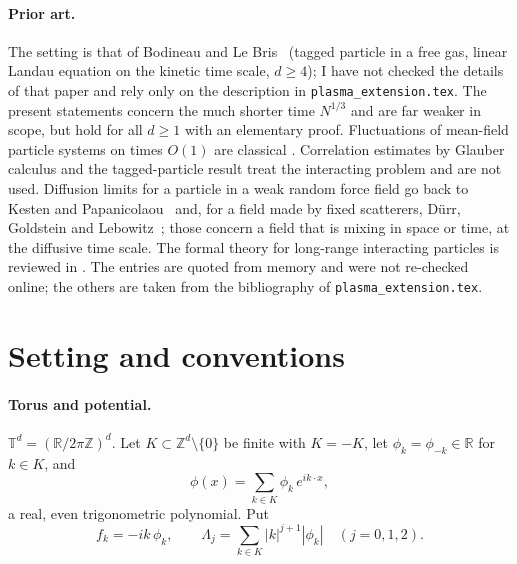 \documentclass[11pt]{article}
\newcommand{\T}{\mathbb{T}}
\newcommand{\R}{\mathbb{R}}
\newcommand{\Z}{\mathbb{Z}}
\theoremstyle{remark}
\begin{document}
\paragraph{Prior art.} The setting is that of Bodineau and Le
Bris~\cite{BodineauLeBris} (tagged particle in a free gas, linear Landau
equation on the kinetic time scale, $d\ge4$); I have not checked the details
of that paper and rely only on the description in
\texttt{plasma\_extension.tex}. The present statements concern the much
shorter time $N^{1/3}$ and are far weaker in scope, but hold for all $d\ge1$
with an elementary proof. Fluctuations of mean-field particle systems on
times $O(1)$ are classical \cite{BraunHepp,Lancellotti}. Correlation
estimates by Glauber calculus \cite{DuerinckxChaos} and the tagged-particle
result \cite{DuerinckxSR} treat the interacting problem and are not used.
Diffusion limits for a particle in a weak random force field go back to
Kesten and Papanicolaou~\cite{KP} and, for a field made by fixed scatterers,
D\"urr, Goldstein and Lebowitz~\cite{DGL}; those concern a field that is
mixing in space or time, at the diffusive time scale. The formal theory for
long-range interacting particles is reviewed in \cite{NVW}. The entries
\cite{KP,DGL,Bill,Kall,RY} are quoted from memory and were not re-checked
online; the others are taken from the bibliography of
\texttt{plasma\_extension.tex}.

\section{Setting and conventions}

\paragraph{Torus and potential.} $\T^d=(\R/2\pi\Z)^d$. Let
$K\subset\Z^d\setminus\{0\}$ be finite with $K=-K$, let
$\phi_k=\phi_{-k}\in\R$ for $k\in K$, and
\[
  \phi(x)=\sum_{k\in K}\phi_k\,e^{ik\cdot x},
\]
a real, even trigonometric polynomial. Put
\[
  f_k=-ik\,\phi_k,\qquad
  \Lambda_j=\sum_{k\in K}|k|^{j+1}|\phi_k|\quad(j=0,1,2).
\]
\end{document}
